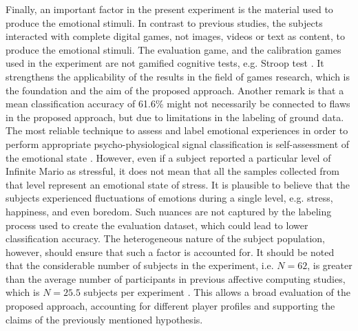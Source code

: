 Finally, an important factor in the present experiment is the material used to produce the emotional stimuli. In contrast to previous studies, the subjects interacted with complete digital games, not images, videos or text as content, to produce the emotional stimuli. The evaluation game, and the calibration games used in the experiment are not gamified cognitive tests, e.g. Stroop test \parencite{golden1978stroop}. It strengthens the applicability of the results in the field of games research, which is the foundation and the aim of the proposed approach. Another remark is that a mean classification accuracy of 61.6\% might not necessarily be connected to flaws in the proposed approach, but due to limitations in the labeling of ground data. The most reliable technique to assess and label emotional experiences in order to perform appropriate psycho-physiological signal classification is self-assessment of the emotional state \parencite{moghimi2017affective}. However, even if a subject reported a particular level of Infinite Mario as stressful, it does not mean that all the samples collected from that level represent an emotional state of stress. It is plausible to believe that the subjects experienced fluctuations of emotions during a single level, e.g. stress, happiness, and even boredom. Such nuances are not captured by the labeling process used to create the evaluation dataset, which could lead to lower classification accuracy. The heterogeneous nature of the subject population, however, should ensure that such a factor is accounted for. It should be noted that the considerable number of subjects in the experiment, i.e. $N=62$, is greater than the average number of participants in previous affective computing studies, which is $N=25.5$ subjects per experiment \parencite{moghimi2017affective}. This allows a broad evaluation of the proposed approach, accounting for different player profiles and supporting the claims of the previously mentioned hypothesis.





